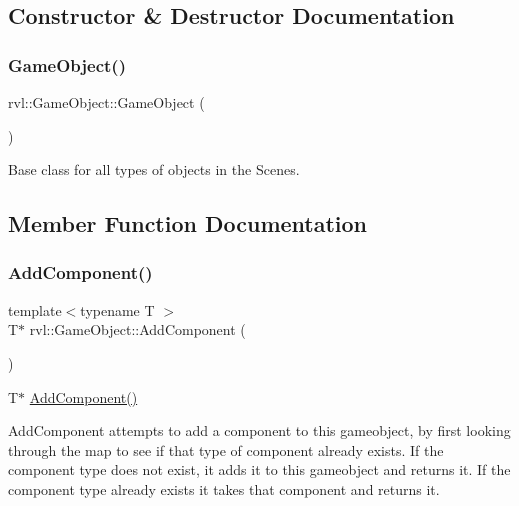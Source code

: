 \subsection{Constructor \& Destructor Documentation}
\mbox{\label{classrvl_1_1_game_object_a14b20a482b003ba31914d4b9071bc843}} 
\subsubsection{\texorpdfstring{Game\+Object()}{GameObject()}}
{\footnotesize\ttfamily rvl\+::\+Game\+Object\+::\+Game\+Object (\begin{DoxyParamCaption}{ }\end{DoxyParamCaption})}

Base class for all types of objects in the Scenes. 

\subsection{Member Function Documentation}
\mbox{\label{classrvl_1_1_game_object_a84757644ca964d0f24e003d35bec60a7}} 
\subsubsection{\texorpdfstring{Add\+Component()}{AddComponent()}}
{\footnotesize\ttfamily template$<$typename T $>$ \\
T$\ast$ rvl\+::\+Game\+Object\+::\+Add\+Component (\begin{DoxyParamCaption}{ }\end{DoxyParamCaption})\hspace{0.3cm}{\ttfamily [inline]}}



T$\ast$ \hyperlink{classrvl_1_1_game_object_a84757644ca964d0f24e003d35bec60a7}{Add\+Component()} 

Add\+Component attempts to add a component to this gameobject, by first looking through the map to see if that type of component already exists. If the component type does not exist, it adds it to this gameobject and returns it. If the component type already exists it takes that component and returns it.

